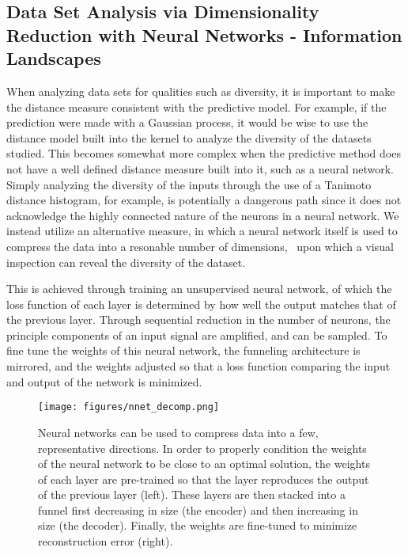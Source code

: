 \subsection{Data Set Analysis via Dimensionality Reduction with Neural Networks - Information Landscapes}

When analyzing data sets for qualities such as diversity, it is important to make the distance measure consistent with the predictive model.  For example, if the prediction were made with a Gaussian process, it would be wise to use the distance model built into the kernel to analyze the diversity of the datasets studied.  This becomes somewhat more complex when the predictive method does not have a well defined distance measure built into it, such as a neural network.  Simply analyzing the diversity of the inputs through the use of a Tanimoto distance histogram, for example, is potentially a dangerous path since it does not acknowledge the highly connected nature of the neurons in a neural network.  We instead utilize an alternative measure, in which a neural network itself is used to compress the data into a resonable number of dimensions,~\cite{hinton_reducing_2006} upon which a visual inspection can reveal the diversity of the dataset.

This is achieved through training an unsupervised neural network, of which the loss function of each layer is determined by how well the output matches that of the previous layer.  Through sequential reduction in the number of neurons, the principle components of an input signal are amplified, and can be sampled.  To fine tune the weights of this neural network, the funneling architecture is mirrored, and the weights adjusted so that a loss function comparing the input and output of the network is minimized.

\begin{figure}[h!]
\centering
\texttt{[image: figures/nnet\_decomp.png]}
\caption{Neural networks can be used to compress data into a few, representative directions. In order to properly condition the weights of the neural network to be close to an optimal solution, the weights of each layer are pre-trained so that the layer reproduces the output of the previous layer (left).  These layers are then stacked into a funnel first decreasing in size (the encoder) and then increasing in size (the decoder).  Finally, the weights are fine-tuned to minimize reconstruction error (right).}
\label{fig:nn_decomp}
\end{figure}

